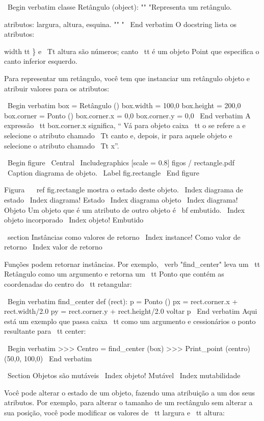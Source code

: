 \documentclass[10pt]{book}
\begin{document}
{{{{{{{{{{{{\ Begin {verbatim}
classe Retângulo (object):
    "" "Representa um retângulo. 

    atributos: largura, altura, esquina.
    "" "
\ End {verbatim}
%
O docstring lista os atributos: {width tt \} e
{\ Tt altura} são números; {canto \ tt} é um objeto Point que
especifica o canto inferior esquerdo.

Para representar um retângulo, você tem que instanciar um retângulo
objeto e atribuir valores para os atributos:

\ Begin {verbatim}
box = Retângulo ()
box.width = 100,0
box.height = 200,0
box.corner = Ponto ()
box.corner.x = 0,0
box.corner.y = 0,0
\ End {verbatim}
%
A expressão {\ tt box.corner.x} significa,
`` Vá para objeto {caixa \ tt} o se refere a e selecione o atributo chamado
{\ Tt canto} e, depois, ir para aquele objeto e selecione o atributo chamado
{\ Tt x}''.

\ Begin {figure}
\ Central
{\ Includegraphics [scale = 0.8] {figos / rectangle.pdf}}
\ Caption {diagrama de objeto.}
\ Label {} fig.rectangle
\ End {figure}


Figura ~ \ ref {} fig.rectangle mostra o estado deste objeto.
\ Index {diagrama de estado}
\ Index {diagrama! Estado}
\ Index {diagrama objeto}
\ Index {diagrama! Objeto}
Um objeto que é um atributo de outro objeto é {\ bf embutido}.
\ Index {objeto incorporado}
\ Index {objeto! Embutido}


\ section {Instâncias como valores de retorno}
\ Index {instance! Como valor de retorno}
\ Index {valor de retorno}

Funções podem retornar instâncias. Por exemplo, \ verb "find_center"
leva um {\ tt Retângulo} como um argumento e retorna um {\ tt Ponto}
que contém as coordenadas do centro do {\ tt retangular}:

\ Begin {verbatim}
find_center def (rect):
    p = Ponto ()
    px = rect.corner.x + rect.width/2.0
    py = rect.corner.y + rect.height/2.0
    voltar p
\ End {verbatim}
%
Aqui está um exemplo que passa {caixa \ tt} como um argumento e cessionários
o ponto resultante para {\ tt center}:

\ Begin {verbatim}
>>> Centro = find_center (box)
>>> Print_point (centro)
(50,0, 100,0)
\ End {verbatim}
%

\ Section {Objetos são mutáveis}
\ Index {objeto! Mutável}
\ Index {} mutabilidade

Você pode alterar o estado de um objeto, fazendo uma atribuição a um dos
seus atributos. Por exemplo, para alterar o tamanho de um rectângulo
sem alterar a sua posição, você pode modificar os valores de {\ tt
largura} e {\ tt altura}:

}}}}}}}}}}}}}
\end{document}
